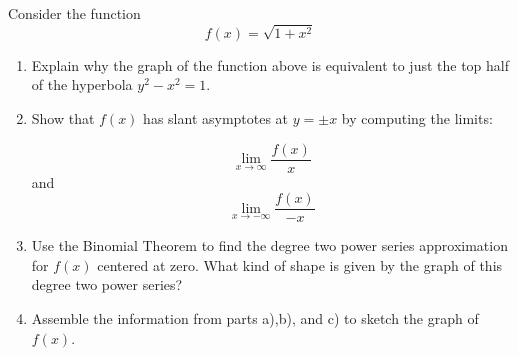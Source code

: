 \begin{exercise}{\Coffeecup \Coffeecup }
Consider the function $$ f(x) = \sqrt{1+x^2}$$
\begin{enumerate}[label=\alph*.)]
\item Explain why the graph of the function above is equivalent to just the top half of the hyperbola $y^2-x^2=1 $.

\item Show that $f(x)$ has slant asymptotes at $y=\pm x$ by computing the limits:

$$\lim_{x\rightarrow \infty} \frac{f(x)}{x} $$
and
$$\lim_{x\rightarrow -\infty} \frac{f(x)}{-x} $$
\item Use the Binomial Theorem to find the degree two power series approximation for $f(x)$ centered at zero.  What kind of shape is given by the graph of this degree two power series?
\item Assemble the information from parts a),b), and c) to sketch the graph of $f(x)$.
\end{enumerate}
\end{exercise}

